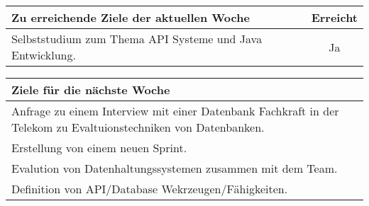 \begin{tabularx}{\textwidth}{Xc}
    \arrayrulecolor{OliveGreen}
    \toprule
    {\bfseries Zu erreichende Ziele der aktuellen Woche} & {\bfseries Erreicht} \\
    \midrule[2pt]
    Selbststudium zum Thema API Systeme und Java Entwicklung. &Ja            \\
    \bottomrule[2pt]
\end{tabularx}
%
\vspace{1cm}
%
\begin{tabularx}{\textwidth}{Xc}
    \arrayrulecolor{OliveGreen}
    \toprule
    {\bfseries Ziele für die nächste Woche}              &                   \\
    \midrule[2pt]
    Anfrage zu einem Interview mit einer Datenbank Fachkraft in der
    Telekom zu Evaltuionstechniken von Datenbanken.  &                       \\
    \rowcolor{OliveGreen!15}
    Erstellung von einem neuen Sprint.  &                                    \\
    \rowcolor{White}
    Evalution von Datenhaltungssystemen zusammen mit dem Team.  &            \\
    \rowcolor{OliveGreen!15}
    Definition von API/Database Wekrzeugen/Fähigkeiten.  &                   \\
\end{tabularx}
